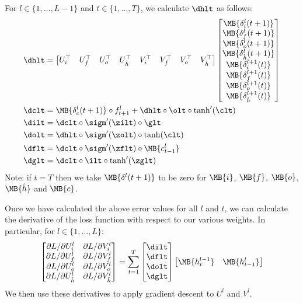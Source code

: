 For $l \in \{1,\dots,L-1\}$ and $t \in \{1,\dots,T\}$, we calculate $\dhlt$ as follows: 
\begin{align*}
\dhlt &= 
\begin{bmatrix}
U_i^\top & U_f^\top & U_o^\top & U_{\hat{h}}^\top & V_i^\top & V_f^\top & V_o^\top & V_{\hat{h}}^\top 
\end{bmatrix}
\begin{bmatrix}
\MB{\delta_i^l(t+1)} \\
\MB{\delta_f^l(t+1)} \\
\MB{\delta_o^l(t+1)} \\
\MB{\delta_{\hat{h}}^l(t+1)} \\
\MB{\delta_i^{l+1}(t)} \\
\MB{\delta_f^{l+1}(t)} \\
\MB{\delta_o^{l+1}(t)} \\
\MB{\delta_{\hat{h}}^{l+1}(t)} 
\end{bmatrix} \\
\dclt &= \MB{\delta_c^l(t+1)} \circ f^l_{t+1} + \dhlt \circ \olt \circ \tanh'(\clt)\\
\dilt &= \dclt \circ \sigm'(\zilt) \circ \glt \\
\dolt &= \dhlt  \circ \sigm'(\zolt) \circ \tanh(\clt) \\
\dflt &= \dclt \circ \sigm'(\zflt) \circ \MB{c_{t-1}^l} \\
\dglt &= \dclt \circ \ilt \circ \tanh'(\zglt)
\end{align*}
Note: if $t=T$ then we take $\MB{\delta^l(t+1)}$ to be zero for $\MB{i}$, $\MB{f}$, $\MB{o}$, $\MB{\hat{h}}$ and $\MB{c}$. 

Once we have calculated the above error values for all $l$ and $t$, we can calculate the derivative of the loss function with respect to our various weights. In particular, for $l \in \{1,\dots,L\}$:
\begin{align*}
\begin{bmatrix}
\partial L / \partial U_i^l & \partial L / \partial V_i^l \\
\partial L / \partial U_f^l & \partial L / \partial V_f^l \\
\partial L / \partial U_o^l & \partial L / \partial V_o^l \\
\partial L / \partial U_{\hat{h}}^l & \partial L / \partial V_{\hat{h}}^l
\end{bmatrix}
= \sum_{t=1}^T 
\begin{bmatrix}
\dilt \\
\dflt \\
\dolt \\
\dglt
\end{bmatrix}
\begin{bmatrix}
\MB{h_t^{l-1}} & \MB{h_{t-1}^l}
\end{bmatrix}
\end{align*}
We then use these derivatives to apply gradient descent to $U^l$ and $V^l$.


